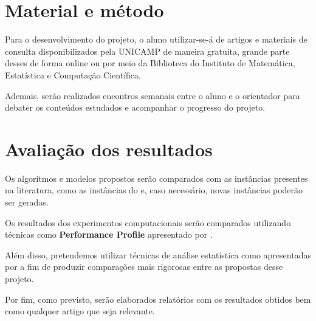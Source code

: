 \documentclass[11pt]{article}
\begin{document}
\section{Material e método}
\label{sec:orgd72aeb7}
Para o desenvolvimento do projeto, o aluno utilizar-se-á de artigos e materiais de consulta disponibilizados pela UNICAMP de maneira gratuita, grande parte desses de forma online ou por meio da Biblioteca do Instituto de Matemática, Estatística e Computação Científica.

Ademais, serão realizados encontros semanais entre o aluno e o orientador para debater os conteúdos estudados e acompanhar o progresso do projeto.

\section{Avaliação dos resultados}
\label{sec:orgd5b9f17}
Os algoritmos e modelos propostos serão comparados com as instâncias presentes na literatura, como as instâncias do \textcite{DIMACSGraphColoringInstances} e, caso necessário, novas instâncias poderão ser geradas.

Os resultados dos experimentos computacionais serão comparados utilizando técnicas como \textbf{Performance Profile} apresentado por \textcite{Dolan2002Benchmarkingoptimizationsoftware}.

Além disso, pretendemos utilizar técnicas de análise estatística como apresentadas por \textcite{Derrac2011practicaltutorialuse} a fim de produzir comparações mais rigorosas entre as propostas desse projeto.

Por fim, como previsto, serão elaborados relatórios com os resultados obtidos bem como qualquer artigo que seja relevante.

\printbibliography
\end{document}
